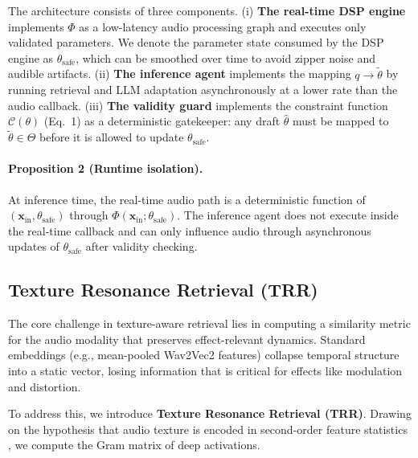 \documentclass{article}
\begin{document}
	The architecture consists of three components. (i) \textbf{The real-time DSP engine} implements $\Phi$ as a low-latency audio processing graph and executes only validated parameters. We denote the parameter state consumed by the DSP engine as $\theta_{\text{safe}}$, which can be smoothed over time to avoid zipper noise and audible artifacts. (ii) \textbf{The inference agent} implements the mapping $q \to \tilde{\theta}$ by running retrieval and LLM adaptation asynchronously at a lower rate than the audio callback. (iii) \textbf{The validity guard} implements the constraint function $\mathcal{C}(\theta)$ (Eq.~1) as a deterministic gatekeeper: any draft $\hat{\theta}$ must be mapped to $\tilde{\theta}\in\Theta$ before it is allowed to update $\theta_{\text{safe}}$.

	\paragraph{Proposition 2 (Runtime isolation).}
	At inference time, the real-time audio path is a deterministic function of $(\mathbf{x}_{\text{in}},\theta_{\text{safe}})$ through $\Phi(\mathbf{x}_{\text{in}};\theta_{\text{safe}})$. The inference agent does not execute inside the real-time callback and can only influence audio through asynchronous updates of $\theta_{\text{safe}}$ after validity checking.

\subsection{Texture Resonance Retrieval (TRR)}
\label{ssec:rag}

The core challenge in texture-aware retrieval lies in computing a similarity metric for the audio modality that preserves effect-relevant dynamics. Standard embeddings (e.g., mean-pooled Wav2Vec2 features) collapse temporal structure into a static vector, losing information that is critical for effects like modulation and distortion.

To address this, we introduce \textbf{Texture Resonance Retrieval (TRR)}. Drawing on the hypothesis that audio texture is encoded in second-order feature statistics \citep{mcdermott2011sound}, we compute the Gram matrix of deep activations.
\end{document}
